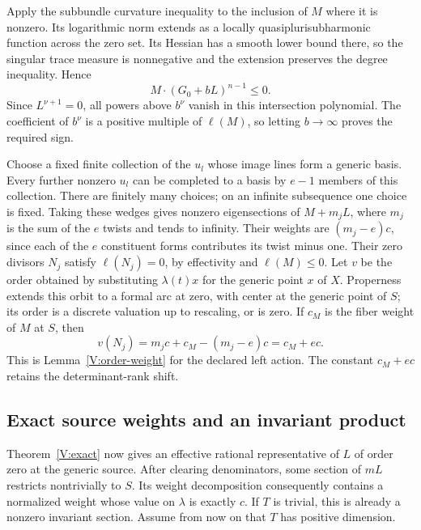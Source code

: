 Apply the subbundle curvature inequality to the inclusion of $M$
where it is nonzero.  Its logarithmic norm extends as a locally
quasiplurisubharmonic function across the zero set.  Its Hessian has
a smooth lower bound there, so the singular trace measure is
nonnegative and the extension preserves the degree inequality.  Hence
\[
 M\cdot(G_0+bL)^{n-1}\leq0.
\]
Since $L^{\nu+1}=0$, all powers above $b^\nu$ vanish in this
intersection polynomial.  The coefficient of $b^\nu$ is a positive
multiple of $\ell(M)$, so letting $b\to\infty$ proves the required
sign.

Choose a fixed finite collection of the $u_l$ whose image lines form
a generic basis. Every further nonzero $u_l$ can be completed to a basis
by $e-1$ members of this collection. There are finitely many choices;
on an infinite subsequence one choice is fixed. Taking these wedges
gives nonzero eigensections of $M+m_jL$, where $m_j$ is the sum of the
$e$ twists and tends to infinity. Their weights are $(m_j-e)c$, since
each of the $e$ constituent forms contributes its twist minus one.  Their zero divisors $N_j$
satisfy $\ell(N_j)=0$, by effectivity and $\ell(M)\leq0$.
Let $v$ be the order obtained by substituting $\lambda(t)x$ for the
generic point $x$ of $X$.  Properness extends this orbit to a formal arc
at zero, with center at the generic point of $S$; its order is a
discrete valuation up to rescaling, or is zero.  If $c_M$ is the fiber
weight of $M$ at $S$, then
\[
 v(N_j)=m_jc+c_M-(m_j-e)c=c_M+ec.
\]
This is Lemma~\ref{V:order-weight} for the declared left action. The
constant $c_M+ec$ retains the determinant-rank shift.

\subsection{Exact source weights and an invariant product}

Theorem~\ref{V:exact} now gives an effective rational
representative of $L$ of order zero at the generic source.  After
clearing denominators, some section of $mL$ restricts nontrivially to
$S$.  Its weight decomposition consequently contains a normalized
weight whose value on $\lambda$ is exactly $c$.  If $T$ is trivial,
this is already a nonzero invariant section.  Assume from now on that
$T$ has positive dimension.

